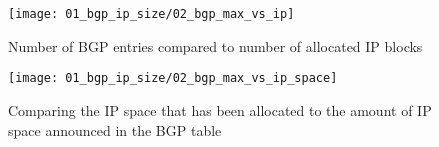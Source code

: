 \begin{figure}[htbp]
	\centering
		\texttt{[image: 01\_bgp\_ip\_size/02\_bgp\_max\_vs\_ip]}
	\caption{Number of BGP entries compared to number of allocated IP blocks}
	\label{fig:BGP vs RIR}
\end{figure}

\begin{figure}[htbp]
	\centering
		\texttt{[image: 01\_bgp\_ip\_size/02\_bgp\_max\_vs\_ip\_space]}
	\caption{Comparing the IP space that has been allocated to the amount of IP space announced in the BGP table}
	\label{fig:BGP vs RIR space}
\end{figure}
%

